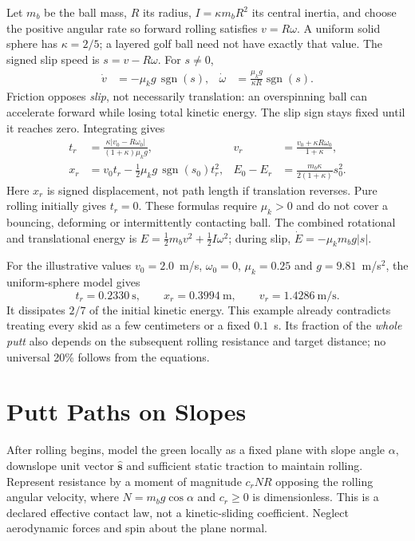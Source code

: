 Let $m_b$ be the ball mass, $R$ its radius, $I=\kappa m_bR^2$ its central inertia, and choose the positive angular rate so forward rolling satisfies $v=R\omega$. A uniform solid sphere has $\kappa=2/5$; a layered golf ball need not have exactly that value. The signed slip speed is $s=v-R\omega$. For $s\ne0$,
\begin{align}
\dot v&=-\mu_k g\,\operatorname{sgn}(s),&
\dot\omega&=\frac{\mu_k g}{\kappa R}\operatorname{sgn}(s).
\end{align}
Friction opposes \emph{slip}, not necessarily translation: an overspinning ball can accelerate forward while losing total kinetic energy. The slip sign stays fixed until it reaches zero. Integrating gives
\begin{align}
t_r&=\frac{\kappa|v_0-R\omega_0|}{(1+\kappa)\mu_k g},&
v_r&=\frac{v_0+\kappa R\omega_0}{1+\kappa},\\
x_r&=v_0t_r-\frac12\mu_k g\,\operatorname{sgn}(s_0)t_r^2,&
E_0-E_r&=\frac{m_b\kappa}{2(1+\kappa)}s_0^2.
\end{align}
Here $x_r$ is signed displacement, not path length if translation reverses. Pure rolling initially gives $t_r=0$. These formulas require $\mu_k>0$ and do not cover a bouncing, deforming or intermittently contacting ball. The combined rotational and translational energy is
$E=\tfrac12m_bv^2+\tfrac12I\omega^2$; during slip, $\dot E=-\mu_km_bg|s|$.

For the illustrative values $v_0=2.0$~m/s, $\omega_0=0$, $\mu_k=0.25$ and $g=9.81$~m/s$^2$, the uniform-sphere model gives
\[
t_r=0.2330~\mathrm{s},\qquad x_r=0.3994~\mathrm{m},\qquad
v_r=1.4286~\mathrm{m/s}.
\]
It dissipates $2/7$ of the initial kinetic energy. This example already contradicts treating every skid as a few centimeters or a fixed $0.1$~s. Its fraction of the \emph{whole putt} also depends on the subsequent rolling resistance and target distance; no universal 20\% follows from the equations.

\section{Putt Paths on Slopes}
\label{sec:putting_slopes}

After rolling begins, model the green locally as a fixed plane with slope angle $\alpha$, downslope unit vector $\hat{\mathbf s}$ and sufficient static traction to maintain rolling. Represent resistance by a moment of magnitude $c_rNR$ opposing the rolling angular velocity, where $N=m_bg\cos\alpha$ and $c_r\ge0$ is dimensionless. This is a declared effective contact law, not a kinetic-sliding coefficient. Neglect aerodynamic forces and spin about the plane normal.

